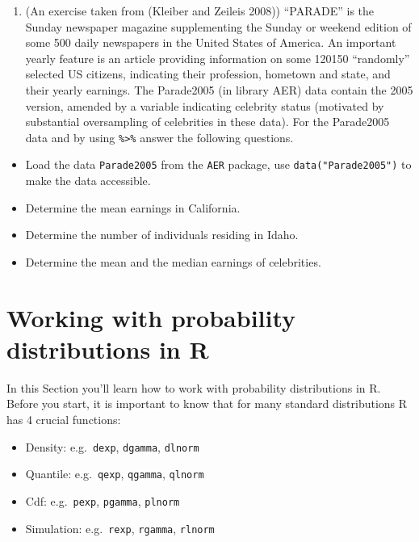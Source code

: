 \documentclass[
]{book}
\providecommand{\tightlist}{%
  \setlength{\itemsep}{0pt}\setlength{\parskip}{0pt}}
\begin{document}
\begin{enumerate}
\def\labelenumi{\arabic{enumi}.}
\tightlist
\item
  (An exercise taken from (Kleiber and Zeileis 2008)) ``PARADE'' is the Sunday newspaper magazine supplementing the Sunday or weekend edition of some 500 daily newspapers in the United States of America. An important
  yearly feature is an article providing information on some 120150 ``randomly'' selected
  US citizens, indicating their profession, hometown and state, and their yearly earnings.
  The Parade2005 (in library AER) data contain the 2005 version, amended by a variable
  indicating celebrity status (motivated by substantial oversampling of celebrities in these data).
  For the Parade2005 data and by using \texttt{\%\textgreater{}\%} answer the following questions.
\end{enumerate}

\begin{itemize}
\tightlist
\item
  Load the data \texttt{Parade2005} from the \texttt{AER} package, use \texttt{data("Parade2005")} to make the data accessible.
\item
  Determine the mean earnings in California.
\item
  Determine the number of individuals residing in Idaho.
\item
  Determine the mean and the median earnings of celebrities.
\end{itemize}

\begin{learncheck}

\end{learncheck}

\hypertarget{probs}{%
\chapter{Working with probability distributions in R}\label{probs}}

In this Section you'll learn how to work with probability distributions in R. Before you start, it is important to know that for many standard distributions R has 4 crucial functions:

\begin{itemize}
\tightlist
\item
  Density: e.g.~\texttt{dexp}, \texttt{dgamma}, \texttt{dlnorm}
\item
  Quantile: e.g.~\texttt{qexp}, \texttt{qgamma}, \texttt{qlnorm}
\item
  Cdf: e.g.~\texttt{pexp}, \texttt{pgamma}, \texttt{plnorm}
\item
  Simulation: e.g.~\texttt{rexp}, \texttt{rgamma}, \texttt{rlnorm}
\end{itemize}
\end{document}
